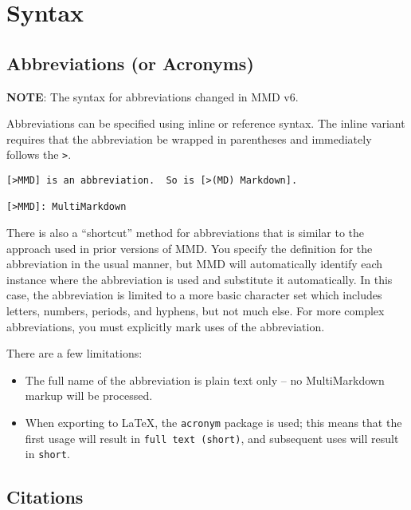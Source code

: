\chapter{Syntax }
\label{syntax}

\section{Abbreviations (or Acronyms)}
\label{abbreviationsoracronyms}

\textbf{NOTE}: The syntax for abbreviations changed in \gls{MMD} v6.

Abbreviations can be specified using inline or reference syntax. The inline variant requires that the abbreviation be wrapped in parentheses and immediately follows the \texttt{>}.

\begin{verbatim}
[>MMD] is an abbreviation.  So is [>(MD) Markdown].

[>MMD]: MultiMarkdown
\end{verbatim}

There is also a ``shortcut'' method for abbreviations that is similar to the approach used in prior versions of \gls{MMD}. You specify the definition for the abbreviation in the usual manner, but \gls{MMD} will automatically identify each instance where the abbreviation is used and substitute it automatically. In this case, the abbreviation is limited to a more basic character set which includes letters, numbers, periods, and hyphens, but not much else. For more complex abbreviations, you must explicitly mark uses of the abbreviation.

There are a few limitations:

\begin{itemize}
\item The full name of the abbreviation is plain text only -- no MultiMarkdown markup will be processed.

\item When exporting to LaTeX, the \texttt{acronym} package is used; this means that the first usage will result in \texttt{full text (short)}, and subsequent uses will result in \texttt{short}.

\end{itemize}

\section{Citations }
\label{citations}

